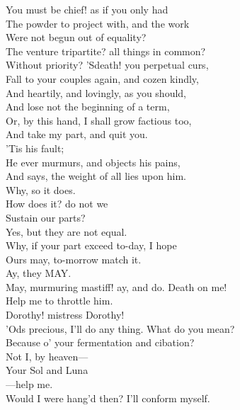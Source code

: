 \documentclass[a4paper,oneside]{memoir}
\begin{document}
\begin{drama*}
You must be chief! as if you only had\\
The powder to project with, and the work\\
Were not begun out of equality?\\
The venture tripartite? all things in common?\\
Without priority? 'Sdeath! you perpetual curs,\\
Fall to your couples again, and cozen kindly,\\
And heartily, and lovingly, as you should,\\
And lose not the beginning of a term,\\
Or, by this hand, I shall grow factious too,\\
And take my part, and quit you.\\
\facespeaks {} 'Tis his fault;\\
He ever murmurs, and objects his pains,\\
And says, the weight of all lies upon him.\\
\subtlespeaks Why, so it does.\\
\dolspeaks {} How does it? do not we\\
Sustain our parts?\\
\subtlespeaks {} Yes, but they are not equal.\\
\dolspeaks Why, if your part exceed to-day, I hope\\
Ours may, to-morrow match it.\\
\subtlespeaks {} Ay, they MAY.\\
\dolspeaks May, murmuring mastiff! ay, and do. Death on me!\\
Help me to throttle him.\\
\subtlespeaks {} Dorothy! mistress Dorothy!\\
'Ods precious, I'll do any thing. What do you mean?\\
\dolspeaks Because o' your fermentation and cibation?\\
\subtlespeaks Not I, by heaven---\\
\dolspeaks {} Your Sol and Luna\\
 ---help me.\\
\subtlespeaks Would I were hang'd then? I'll conform myself.\\

\end{drama*}
\end{document}
